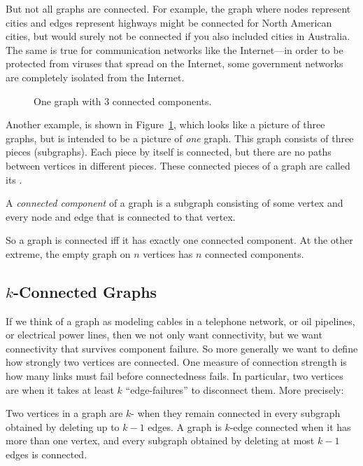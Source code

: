 But not all graphs are connected.  For example, the graph where nodes
represent cities and edges represent highways might be connected for
North American cities, but would surely not be connected if you also
included cities in Australia.  The same is true for communication
networks like the Internet---in order to be protected from viruses
that spread on the Internet, some government networks are completely
isolated from the Internet.

\begin{figure}[htbp]


\caption{One graph with 3 connected components.}

\label{fig:3comp}
\end{figure}

Another example, is shown in Figure~\ref{fig:3comp}, which looks like a
picture of three graphs, but is intended to be a picture of \emph{one}
graph.  This graph consists of three pieces (subgraphs).  Each piece
by itself is connected, but there are no paths between vertices in
different pieces.  These connected pieces of a graph are called its
.

\begin{definition}\label{def:connected-component}
A \emph{connected component} of a graph is a subgraph consisting of
some vertex and every node and edge that is connected to that vertex.
\end{definition}

So a graph is connected iff it has exactly one connected component.
At the other extreme, the empty graph on $n$ vertices has $n$
connected components.

\subsection{$k$-Connected Graphs}

If we think of a graph as modeling cables in a telephone network, or
oil pipelines, or electrical power lines, then we not only want
connectivity, but we want connectivity that survives component
failure.  So more generally we want to define how strongly two
vertices are connected.  One measure of connection strength is how
many links must fail before connectedness fails.  In particular, two
vertices are  when it takes at least $k$
``edge-failures'' to disconnect them.  More precisely:

\begin{definition}\label{def:k-connected}
Two vertices in a graph are $k$- when they remain
connected in every subgraph obtained by deleting up to $k-1$ edges.  A
graph is $k$-edge
connected when it has
more than one vertex, and every subgraph obtained by deleting at most
$k-1$ edges is connected.
\end{definition}
\iffalse
every two of its vertices are $k$-edge connected.
\fi

